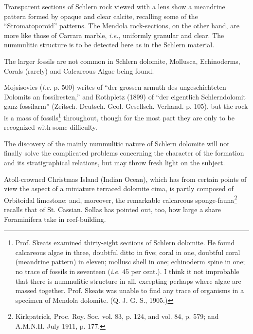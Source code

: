 \documentclass[a4paper, 12pt, oneside, landscape]{article}
\begin{document}
Transparent sections of Schlern rock viewed with a lens show a meandrine pattern formed by opaque and clear calcite, recalling some of the ``Stromatoporoid'' patterns. The Mendola rock-sections, on the other hand, are more like those of Carrara marble, \emph{i.e.}, uniformly granular and clear. The nummulitic structure is to be detected here as in the Schlern material.

The larger fossils are not common in Schlern dolomite, Mollusca, Echinoderms, Corals (rarely) and Calcareous Algae being found.

Mojsisovics (\emph{l.c.} p. 500) writes of ``der grossen armuth des ungeschichteten Dolomits an fossilresten,'' and Rothpletz (1899) of ``der eigentlich Schlerndolomit ganz fossilarm'' (Zeitsch. Deutsch. Geol. Gesellsch. Verhand. p. 105), but the rock is a mass of fossils\footnote{Prof. Skeats examined thirty-eight sections of Schlern dolomite. He found calcareous algae in three, doubtful ditto in five; coral in one, doubtful coral (meandrine pattern) in eleven; mollusc shell in one; echinoderm spine in one; no trace of fossils in seventeen (\emph{i.e.} 45 per cent.). I think it not improbable that there is nummulitic structure in all, excepting perhaps where algae are massed together. Prof. Skeats was unable to find any trace of organisms in a specimen of Mendola dolomite. (Q. J. G. S., 1905.)} throughout, though for the most part they are only to be recognized with some difficulty.

The discovery of the mainly nummulitic nature of Schlern dolomite will not finally solve the complicated problems concerning the character of the formation and its stratigraphical relations, but may throw fresh light on the subject.

Atoll-crowned Christmas Island (Indian Ocean), which has from certain points of view the aspect of a miniature terraced dolomite cima, is partly composed of Orbitoidal limestone: and, moreover, the remarkable calcareous sponge-fauna\footnote{Kirkpatrick, Proc. Roy. Soc. vol. 83, p. 124, and vol. 84, p. 579; and A.M.N.H. July 1911, p. 177.} recalls that of St. Cassian. Sollas has pointed out, too, how large a share Foraminifera take in reef-building.
\end{document}
